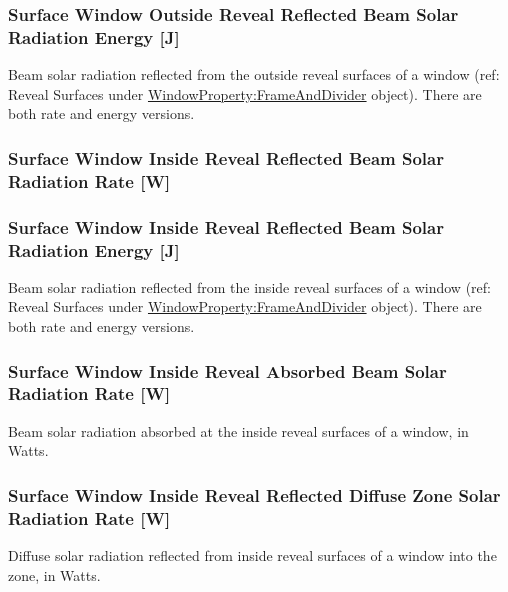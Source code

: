 \subsubsection{Surface Window Outside Reveal Reflected Beam Solar Radiation Energy {[}J{]}}\label{surface-window-outside-reveal-reflected-beam-solar-radiation-energy-j}

Beam solar radiation reflected from the outside reveal surfaces of a window (ref: Reveal Surfaces under \hyperref[windowpropertyframeanddivider]{WindowProperty:FrameAndDivider} object). There are both rate and energy versions.

\subsubsection{Surface Window Inside Reveal Reflected Beam Solar Radiation Rate {[}W{]}}\label{surface-window-inside-reveal-reflected-beam-solar-radiation-rate-w}

\subsubsection{Surface Window Inside Reveal Reflected Beam Solar Radiation Energy {[}J{]}}\label{surface-window-inside-reveal-reflected-beam-solar-radiation-energy-j}

Beam solar radiation reflected from the inside reveal surfaces of a window (ref: Reveal Surfaces under \hyperref[windowpropertyframeanddivider]{WindowProperty:FrameAndDivider} object). There are both rate and energy versions.

\subsubsection{Surface Window Inside Reveal Absorbed Beam Solar Radiation Rate {[}W{]}}\label{surface-window-inside-reveal-absorbed-beam-solar-radiation-rate-w}

Beam solar radiation absorbed at the inside reveal surfaces of a window, in Watts.

\subsubsection{Surface Window Inside Reveal Reflected Diffuse Zone Solar Radiation Rate {[}W{]}}\label{surface-window-inside-reveal-reflected-diffuse-zone-solar-radiation-rate-w}

Diffuse solar radiation reflected from inside reveal surfaces of a window into the zone, in Watts.

